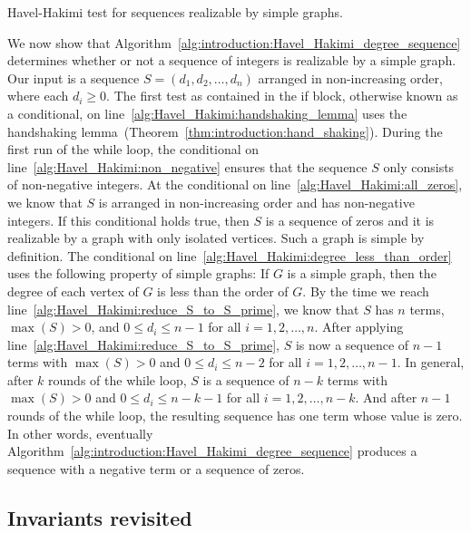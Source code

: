 \begin{algorithm}[!htbp]

\caption{Havel-Hakimi test for sequences realizable by simple graphs.}
\label{alg:introduction:Havel_Hakimi_degree_sequence}
\end{algorithm}

We now show that
Algorithm~\ref{alg:introduction:Havel_Hakimi_degree_sequence}
determines whether or not a sequence of integers is realizable by a
simple graph. Our input is a sequence $S = (d_1, d_2, \dots, d_n)$
arranged in non-increasing order, where each $d_i \geq 0$. The first
test as contained in the if block, otherwise known as a
conditional, on line~\ref{alg:Havel_Hakimi:handshaking_lemma} uses the
handshaking
lemma~(Theorem~\ref{thm:introduction:hand_shaking}). During the first
run of the while loop, the conditional on
line~\ref{alg:Havel_Hakimi:non_negative} ensures that the sequence $S$
only consists of non-negative integers. At the conditional on
line~\ref{alg:Havel_Hakimi:all_zeros}, we know that $S$ is arranged in
non-increasing order and has non-negative integers. If this
conditional holds true, then $S$ is a sequence of zeros and it is
realizable by a graph with only isolated vertices. Such a graph is
simple by definition. The conditional on
line~\ref{alg:Havel_Hakimi:degree_less_than_order} uses the following
property of simple graphs: If $G$ is a simple graph, then the degree
of each vertex of $G$ is less than the order of $G$. By the time we
reach line~\ref{alg:Havel_Hakimi:reduce_S_to_S_prime}, we know that
$S$ has $n$ terms, $\max(S) > 0$, and $0 \leq d_i \leq n - 1$ for all
$i = 1, 2, \dots, n$. After applying
line~\ref{alg:Havel_Hakimi:reduce_S_to_S_prime}, $S$ is now a sequence
of $n - 1$ terms with $\max(S) > 0$ and $0 \leq d_i \leq n - 2$ for all
$i = 1, 2, \dots, n-1$. In general, after $k$ rounds of the while
loop, $S$ is a sequence of $n - k$ terms with $\max(S) > 0$ and
$0 \leq d_i \leq n - k - 1$ for all $i = 1, 2, \dots, n-k$. And after
$n - 1$ rounds of the while loop, the resulting sequence has one term
whose value is zero. In other words, eventually
Algorithm~\ref{alg:introduction:Havel_Hakimi_degree_sequence} produces
a sequence with a negative term or a sequence of zeros.



\subsection{Invariants revisited}

